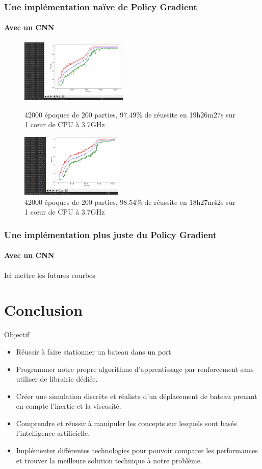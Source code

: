 \documentclass[8pt]{beamer}
\def\fin#1{\leavevmode\unskip\nobreak\quad\hspace*{\fill}{#1}}
\begin{document}
\begin{frame}
  \frametitle{Une implémentation naïve de Policy Gradient}
  \framesubtitle{Avec un CNN}

  \begin{figure}
    \begin{minipage}[c]{.46\linewidth}
      \centering
      \includegraphics[height=30mm]{97-33_2.png}
      \caption{42000 époques de 200 parties, 97.49\% de réussite en 19h26m27s sur 1 cœur de CPU à 3.7GHz}
    \end{minipage}
    \hfill%
    \begin{minipage}[c]{.46\linewidth}
      \centering
      \includegraphics[height=30mm]{98-47_4.png}
      \caption{42000 époques de 200 parties, 98.54\% de réussite en 18h27m42s sur 1 cœur de CPU à 3.7GHz}
    \end{minipage}
  \end{figure}

\end{frame}

\begin{frame}
  \frametitle{Une implémentation plus juste du Policy Gradient}
  \framesubtitle{Avec un CNN}
  Ici mettre les futures courbes
\end{frame}


\section*{Conclusion}

\begin{frame}{Objectif}
  \begin{itemize}
    \item Réussir à faire stationner un bateau dans un port \break
\item Programmer notre propre algorithme d'apprentissage par renforcement sans utiliser de librairie dédiée. \fin{\huge \checkmark} \break
\item Créer une simulation discrète et réaliste d'un déplacement de bateau prenant en compte l'inertie et la viscosité. \fin{\huge \checkmark} \break
\item Comprendre et réussir à manipuler les concepts sur lesquels sont basés l'intelligence artificielle. \fin{\huge \checkmark} \break
\item Implémenter différentes technologies pour pouvoir comparer les performances et trouver la meilleure solution technique à notre problème. \fin{\huge $\sim$}
  \end{itemize}
\end{frame}
\end{document}
